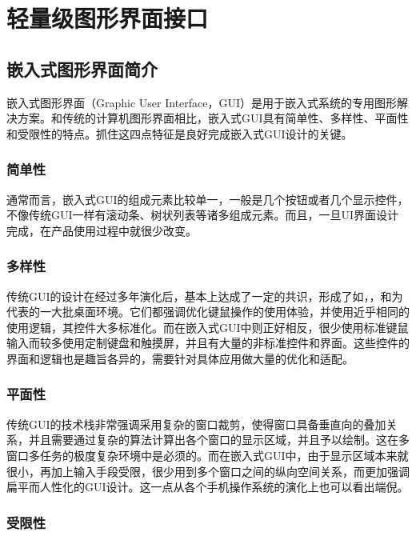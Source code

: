 \chapter{轻量级图形界面接口}\label{ch:lightweight-graphics-interface}

\section{嵌入式图形界面简介}\label{sec:introduction-to-embedded-graphical-interfaces}

嵌入式图形界面（Graphic User
Interface，GUI）是用于嵌入式系统的专用图形解决方案。和传统的计算机图形界面相比，嵌入式GUI具有简单性、多样性、平面性和受限性的特点。抓住这四点特征是良好完成嵌入式GUI设计的关键。

\subsection{简单性}\label{subsec:simplicity}

通常而言，嵌入式GUI的组成元素比较单一，一般是几个按钮或者几个显示控件，不像传统GUI一样有滚动条、树状列表等诸多组成元素。而且，一旦UI界面设计完成，在产品使用过程中就很少改变。

\subsection{多样性}\label{subsec:diversity}

传统GUI的设计在经过多年演化后，基本上达成了一定的共识，形成了如，，和为代表的一大批桌面环境。它们都强调优化键鼠操作的使用体验，并使用近乎相同的使用逻辑，其控件大多标准化。而在嵌入式GUI中则正好相反，很少使用标准键鼠输入而较多使用定制键盘和触摸屏，并且有大量的非标准控件和界面。这些控件的界面和逻辑也是趣旨各异的，需要针对具体应用做大量的优化和适配。

\subsection{平面性}\label{subsec:planarity}

传统GUI的技术栈非常强调采用复杂的窗口裁剪，使得窗口具备垂直向的叠加关系，并且需要通过复杂的算法计算出各个窗口的显示区域，并且予以绘制。这在多窗口多任务的极度复杂环境中是必须的。而在嵌入式GUI中，由于显示区域本来就很小，再加上输入手段受限，很少用到多个窗口之间的纵向空间关系，而更加强调扁平而人性化的GUI设计。这一点从各个手机操作系统的演化上也可以看出端倪。

\subsection{受限性}\label{subsec:restriction}

